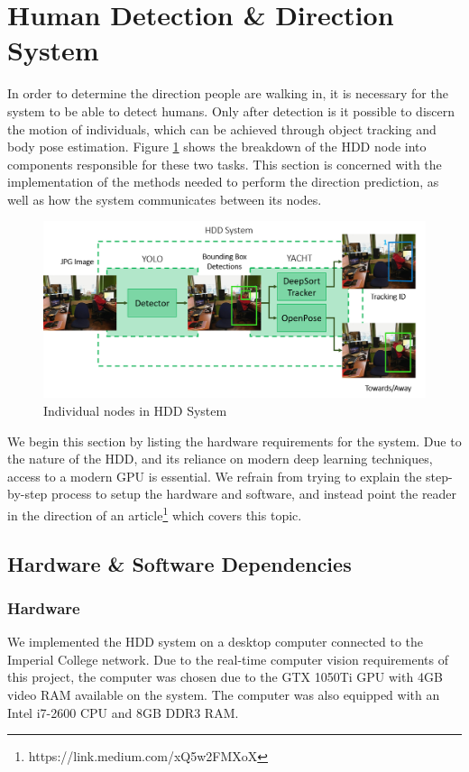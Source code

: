 \section{Human Detection \& Direction System}
In order to determine the direction people are walking in, it is necessary for the system to be able to detect humans. Only after detection is it possible to discern the motion of individuals, which can be achieved through object tracking and body pose estimation. Figure \ref{fig:detailedHDD} shows the breakdown of the HDD node into components responsible for these two tasks. This section is concerned with the implementation of the methods needed to perform the direction prediction, as well as how the system communicates between its nodes. 

\begin{figure}[ht]
	\centering
	\includegraphics[width=1.0\linewidth]{img/chapter5_implementation/hddSystemDiagram.png}
	\caption{Individual nodes in HDD System}
	\label{fig:detailedHDD}
\end{figure}

We begin this section by listing the hardware requirements for the system. Due to the nature of the HDD, and its reliance on modern deep learning techniques, access to a modern GPU is essential. We refrain from trying to explain the step-by-step process to setup the hardware and software, and instead point the reader in the direction of an article\footnote{https://link.medium.com/xQ5w2FMXoX} which covers this topic.

\subsection{Hardware \& Software Dependencies}

\subsubsection{Hardware}
We implemented the HDD system on a desktop computer connected to the Imperial College network. Due to the real-time computer vision requirements of this project, the computer was chosen due to the GTX 1050Ti GPU with 4GB video RAM available on the system. The computer was also equipped with an Intel i7-2600 CPU and 8GB DDR3 RAM.

